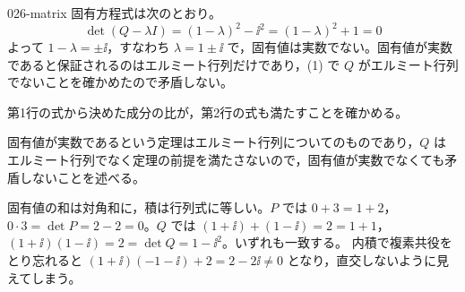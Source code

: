 \documentclass[uplatex,dvipdfmx,a4paper,11pt]{jsarticle}
\begin{document}
\begin{kaisetsu}{026-matrix}
 固有方程式は次のとおり。
\[ \det(Q-\lambda I)=(1-\lambda)^{2}-\ii^{2}=(1-\lambda)^{2}+1=0 \]
よって $1-\lambda=\pm\ii$，すなわち $\lambda=1\pm\ii$ で，固有値は実数でない。固有値が実数であると保証されるのはエルミート行列だけであり，(1) で $Q$ がエルミート行列でないことを確かめたので矛盾しない。
\begin{ronten}
  \item {} 第1行の式から決めた成分の比が，第2行の式も満たすことを確かめる。
  \item {} 固有値が実数であるという定理はエルミート行列についてのものであり，$Q$ はエルミート行列でなく定理の前提を満たさないので，固有値が実数でなくても矛盾しないことを述べる。
\end{ronten}
\kenzan 固有値の和は対角和に，積は行列式に等しい。$P$ では $0+3=1+2$，$0\cdot 3=\det P=2-2=0$。$Q$ では $(1+\ii)+(1-\ii)=2=1+1$，$(1+\ii)(1-\ii)=2=\det Q=1-\ii^{2}$。いずれも一致する。
\tsumazuki 内積で複素共役をとり忘れると $(1+\ii)(-1-\ii)+2=2-2\ii\neq 0$ となり，直交しないように見えてしまう。
\end{kaisetsu}
\end{document}
